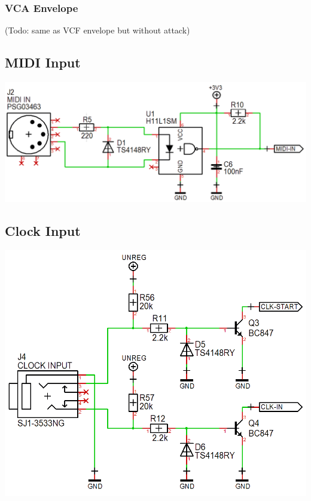 \documentclass{scrartcl}
\begin{document}
\subsubsection{VCA Envelope}

(Todo: same as VCF envelope but without attack)

\subsection{MIDI Input}

\begin{center}
    \includegraphics[scale=0.40]{assets/schema-midi.png}
\end{center}

\subsection{Clock Input}

\begin{center}
    \includegraphics[scale=0.40]{assets/schema-clocks.png}
\end{center}
\end{document}
